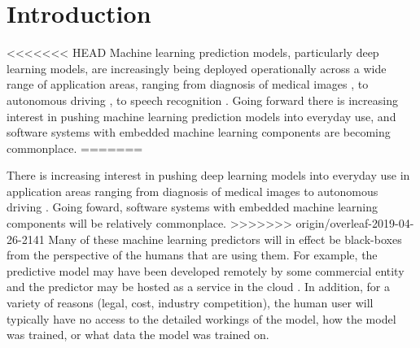 \documentclass{article}
\newcommand{\robby}[1]{\textcolor{Red}{[#1]\textsubscript{Robby}}}
\begin{document}
\section{Introduction}

<<<<<<< HEAD
Machine learning prediction models, particularly deep learning models, are increasingly being deployed operationally across a wide range of application areas,  ranging from diagnosis of medical images \cite{kermany2018identifying}, to autonomous driving \cite{du2017fused}, to speech recognition \cite{hinton2012deep}.
Going forward there is increasing interest in pushing machine learning prediction models into everyday use, and software systems with embedded machine learning components are becoming commonplace.
=======
 
There is increasing interest in pushing deep learning models into everyday use in application areas ranging from   diagnosis of medical images \cite{kermany2018identifying} to autonomous driving \cite{du2017fused}. Going foward, software systems with embedded machine learning components will be relatively commonplace.  
>>>>>>> origin/overleaf-2019-04-26-2141
Many of these machine learning predictors will in effect be black-boxes from the perspective of  the humans that are using them. For example, the predictive model may have been developed remotely by some commercial entity  and the predictor may be hosted as a  service in the cloud  \cite{sanyal2018tapas}.
In addition, for a variety of reasons (legal, cost, industry competition), the human user will typically have no access to the detailed workings of the model, how the model was trained, or what data the model was trained on.
\end{document}
